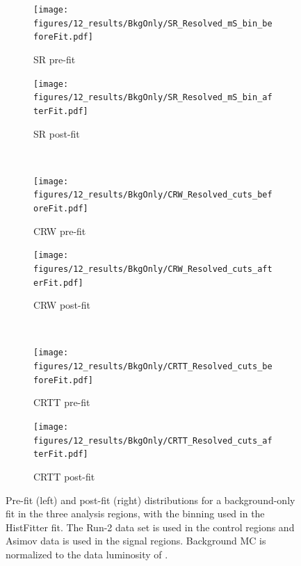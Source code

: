 \begin{figure}[!tb]
  \centering
  \begin{subfigure}{0.45\textwidth}
    \texttt{[image: figures/12\_results/BkgOnly/SR\_Resolved\_mS\_bin\_beforeFit.pdf]}
    \caption{\resolved SR pre-fit}\label{fig:prefit_resolved_SR_bkgonly}
  \end{subfigure} \hspace{1em}
  \begin{subfigure}{0.45\textwidth}
    \texttt{[image: figures/12\_results/BkgOnly/SR\_Resolved\_mS\_bin\_afterFit.pdf]}
    \caption{\resolved SR post-fit}\label{fig:postfit_resolved_SR_bkgonly}
  \end{subfigure} \\ \vspace{1em}
  \begin{subfigure}{0.45\textwidth}
    \texttt{[image: figures/12\_results/BkgOnly/CRW\_Resolved\_cuts\_beforeFit.pdf]}
    \caption{\resolved CRW pre-fit}\label{fig:prefit_resolved_CRW_bkgonly}
  \end{subfigure} \hspace{1em}
  \begin{subfigure}{0.45\textwidth}
    \texttt{[image: figures/12\_results/BkgOnly/CRW\_Resolved\_cuts\_afterFit.pdf]}
    \caption{\resolved CRW post-fit}\label{fig:postfit_resolved_CRW_bkgonly}
  \end{subfigure} \\ \vspace{1em}
    \begin{subfigure}{0.45\textwidth}
    \texttt{[image: figures/12\_results/BkgOnly/CRTT\_Resolved\_cuts\_beforeFit.pdf]}
    \caption{\resolved CRTT pre-fit}\label{fig:prefit_resolved_CRTT_bkgonly}
  \end{subfigure} \hspace{1em}
  \begin{subfigure}{0.45\textwidth}
    \texttt{[image: figures/12\_results/BkgOnly/CRTT\_Resolved\_cuts\_afterFit.pdf]}
    \caption{\resolved CRTT post-fit}\label{fig:postfit_resolved_CRTT_bkgonly}
  \end{subfigure}
  \caption[Pre- and post-fit distributions in \resolved analysis regions for background-only fit]{Pre-fit (left) and post-fit (right) distributions for a background-only fit in the three \resolved analysis regions, with the binning used in the HistFitter fit. The Run-2 data set is used in the control regions and Asimov data is used in the signal regions. Background MC is normalized to the data luminosity of \Lumi.}
  \label{fig:pre_post_resolved_bkgonly}
\end{figure}

